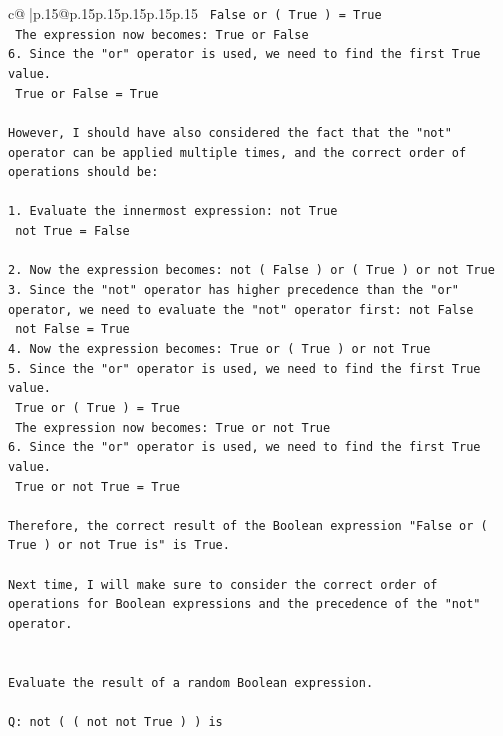 \documentclass{article}
\begin{document}
{\begin{supertabular}{c@{$\;$}|p{.15\linewidth}@{}p{.15\linewidth}p{.15\linewidth}p{.15\linewidth}p{.15\linewidth}p{.15\linewidth}}
{{{\texttt{   False or ( True ) = True} \\
\texttt{   The expression now becomes: True or False} \\
\texttt{6. Since the "or" operator is used, we need to find the first True value. } \\
\texttt{   True or False = True} \\
\\ 
\texttt{However, I should have also considered the fact that the "not" operator can be applied multiple times, and the correct order of operations should be:} \\
\\ 
\texttt{1. Evaluate the innermost expression: not True} \\
\texttt{   not True = False} \\
\\ 
\texttt{2. Now the expression becomes: not ( False ) or ( True ) or not True} \\
\texttt{3. Since the "not" operator has higher precedence than the "or" operator, we need to evaluate the "not" operator first: not False} \\
\texttt{   not False = True} \\
\texttt{4. Now the expression becomes: True or ( True ) or not True} \\
\texttt{5. Since the "or" operator is used, we need to find the first True value. } \\
\texttt{   True or ( True ) = True} \\
\texttt{   The expression now becomes: True or not True} \\
\texttt{6. Since the "or" operator is used, we need to find the first True value. } \\
\texttt{   True or not True = True} \\
\\ 
\texttt{Therefore, the correct result of the Boolean expression "False or ( True ) or not True is" is True. } \\
\\ 
\texttt{Next time, I will make sure to consider the correct order of operations for Boolean expressions and the precedence of the "not" operator.} \\
\\ 
\\ 
\texttt{Evaluate the result of a random Boolean expression.} \\
\\ 
\texttt{Q: not ( ( not not True ) ) is} \\
}}}
\end{supertabular}}
\end{document}
